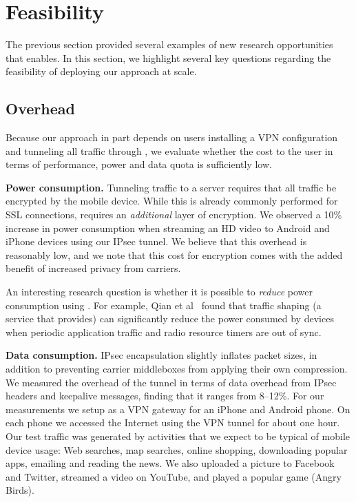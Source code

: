 \section{Feasibility}
\label{sec:eval}
The previous section provided several examples of new research opportunities that \meddle enables. In this section, we highlight several key questions regarding the feasibility of deploying our approach at scale.

\subsection{Overhead}
\label{subsec:cost}
Because our approach in part depends on users installing a VPN configuration and tunneling all traffic through \meddle, we evaluate whether the cost to the user in terms of performance, power and data quota is sufficiently low.

\noindent\textbf{Power consumption.} Tunneling traffic to a \meddle
server requires that all traffic be encrypted by the mobile
device. While this is already commonly performed for SSL connections,
\meddle requires an \emph{additional} layer of encryption. We observed
a 10\% increase in power consumption when streaming an HD video to
Android and iPhone devices using our IPsec tunnel. We believe that this 
overhead is reasonably low, and we note that this cost for encryption comes with the added benefit of increased 
privacy from carriers.

An interesting research question is whether it is possible to \emph{reduce} power consumption using \meddle. For example, Qian et al~\cite{qian:rrc,qian:aro,qian:periodic} found that traffic shaping (a service that \meddle provides) can significantly reduce the power consumed by devices when periodic application traffic and radio resource timers are out of sync.

\noindent\textbf{Data consumption.} IPsec encapsulation slightly inflates packet sizes, in addition to
preventing carrier middleboxes from applying their own compression. We
measured the overhead of the tunnel in terms of data overhead from IPsec 
headers and keepalive
messages, finding that it ranges from 8--12\%. For our measurements we setup \meddle
as a VPN gateway for an iPhone and Android phone. On each phone
we accessed the Internet using the VPN tunnel for about one hour. Our
test traffic was generated by activities that we expect to be typical of mobile 
device usage: Web searches, map searches, online shopping, 
downloading popular apps, emailing and reading the news. We also uploaded a picture to 
Facebook and Twitter, streamed a video on YouTube, and played a popular game (Angry Birds). 

